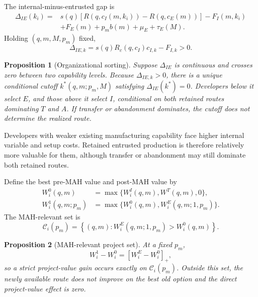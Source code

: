 \documentclass[12pt]{article}
\newtheorem{proposition}{Proposition}
\newcommand{\1}{\mathbf{1}}
\begin{document}
The internal-minus-entrusted gap is
\begin{equation}
  \begin{aligned}
  \Delta_{IE}(k_i)
  ={}&
  s(q)\!\left[
  R\!\left(q,c_I(m,k_i)\right)-R\!\left(q,c_E(m)\right)
  \right]-F_I(m,k_i)\\
  &+F_E(m)+p_mb(m)+\mu_E+\tau_E(M).
  \end{aligned}
  \label{eq:p16m-gap}
\end{equation}
Holding \((q,m,M,p_m)\) fixed,
\[
  \Delta_{IE,k}
  =
  s(q)R_c\!\left(q,c_I\right)c_{I,k}-F_{I,k}>0.
\]
\begin{proposition}[Organizational sorting]
\label{prop:main-organizational-sorting}
Suppose \(\Delta_{IE}\) is continuous and crosses zero between two capability
levels. Because \(\Delta_{IE,k}>0\), there is a unique conditional cutoff
\(k^*(q,m;p_m,M)\) satisfying \(\Delta_{IE}(k^*)=0\). Developers below it
select \(E\), and those above it select \(I\), conditional on both retained
routes dominating \(T\) and \(A\). If transfer or abandonment dominates, the
cutoff does not determine the realized route.
\end{proposition}

Developers with weaker existing manufacturing capability face higher internal
variable and setup costs. Retained entrusted production is therefore
relatively more valuable for them, although transfer or abandonment may still
dominate both retained routes.

Define the best pre-MAH value and post-MAH value by
\begin{equation}
  \begin{aligned}
  W_i^0(q,m)
  &=\max\{W_i^I(q,m),W^T(q,m),0\},\\
  W_i^1(q,m;p_m)
  &=\max\{W_i^0(q,m),W_i^E(q,m;1,p_m)\}.
  \end{aligned}
  \label{eq:p16m-old-new-values}
\end{equation}
The MAH-relevant set is
\begin{equation}
  \mathcal C_i(p_m)
  =\left\{(q,m):
  W_i^E(q,m;1,p_m)>W_i^0(q,m)
  \right\}.
  \label{eq:p16m-relevant-set}
\end{equation}

\begin{proposition}[MAH-relevant project set]
\label{prop:main-relevant-set}
At a fixed \(p_m\),
\begin{equation}
  W_i^1-W_i^0
  =
  [W_i^E-W_i^0]_+,
  \label{eq:p16m-positive-part}
\end{equation}
so a strict project-value gain occurs exactly on
\(\mathcal C_i(p_m)\). Outside this set, the newly available route does not
improve on the best old option and the direct project-value effect is zero.
\end{proposition}
\end{document}
